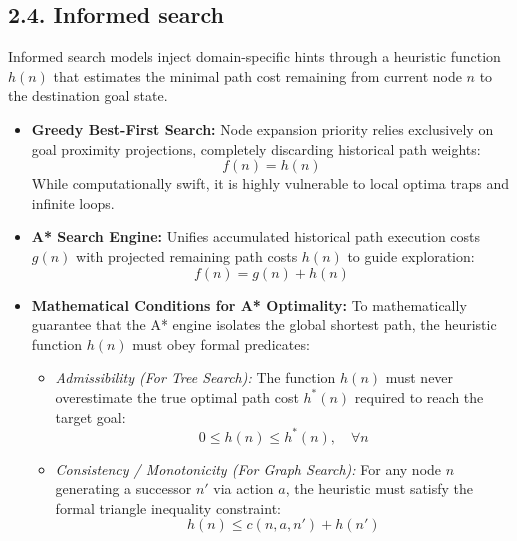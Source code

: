 \documentclass[11pt,a4paper]{article}
\begin{document}
\subsection{2.4. Informed search}
Informed search models inject domain-specific hints through a heuristic function $h(n)$ that estimates the minimal path cost remaining from current node $n$ to the destination goal state.
\begin{itemize}
    \item \textbf{Greedy Best-First Search:} Node expansion priority relies exclusively on goal proximity projections, completely discarding historical path weights:
    \begin{equation}
        f(n) = h(n)
    \end{equation}
    While computationally swift, it is highly vulnerable to local optima traps and infinite loops.
    \item \textbf{A* Search Engine:} Unifies accumulated historical path execution costs $g(n)$ with projected remaining path costs $h(n)$ to guide exploration:
    \begin{equation}
        f(n) = g(n) + h(n)
    \end{equation}
    \item \textbf{Mathematical Conditions for A* Optimality:} To mathematically guarantee that the A* engine isolates the global shortest path, the heuristic function $h(n)$ must obey formal predicates:
    \begin{itemize}
        \item \textit{Admissibility (For Tree Search):} The function $h(n)$ must never overestimate the true optimal path cost $h^*(n)$ required to reach the target goal:
        \begin{equation}
            0 \le h(n) \le h^*(n), \quad \forall n
        \end{equation}
        \item \textit{Consistency / Monotonicity (For Graph Search):} For any node $n$ generating a successor $n'$ via action $a$, the heuristic must satisfy the formal triangle inequality constraint:
        \begin{equation}
            h(n) \le c(n, a, n') + h(n')
        \end{equation}
    \end{itemize}
\end{itemize}
\end{document}
